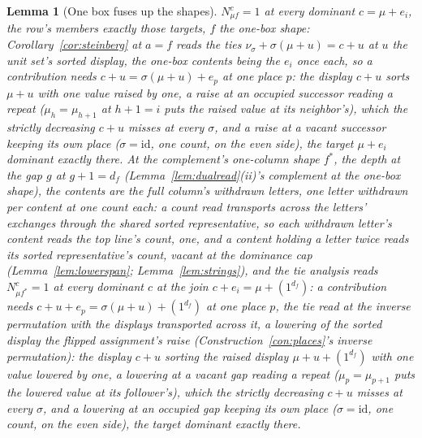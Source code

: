\documentclass[11pt]{article}
\newtheorem{lemma}{Lemma}
\theoremstyle{definition}
\begin{document}
\begin{lemma}[One box fuses up the shapes]\label{lem:pieri}
$N^c_{\mu f}=1$ at every dominant $c=\mu+e_i$, the row's members
exactly those targets, $f$ the
one-box shape: Corollary~\ref{cor:steinberg} at $a=f$ reads the ties
$\nu_\sigma+\sigma(\mu+u)=c+u$ at $u$ the unit set's sorted
display, the one-box
contents being the $e_i$ once each, so a contribution needs
$c+u=\sigma(\mu+u)+e_p$ at one place $p$: the display $c+u$ sorts
$\mu+u$ with one value raised by one, a raise at an occupied
successor reading a repeat ($\mu_h=\mu_{h+1}$ at $h+1=i$ puts the
raised value at its neighbor's), which the strictly decreasing
$c+u$ misses at every $\sigma$, and a raise at a vacant successor
keeping its own place ($\sigma=\mathrm{id}$, one count, on the
even side), the target $\mu+e_i$ dominant exactly there. At the
complement's one-column shape $f^*$, the depth at the gap $g$ at
$g+1=d_f$ (Lemma~\ref{lem:dualread}(ii)'s complement at the
one-box shape), the contents are the full column's withdrawn
letters, one letter withdrawn per content at one count each: a
count read transports across the letters' exchanges through the
shared sorted representative, so each withdrawn letter's content
reads the top line's count, one, and a content holding a letter
twice reads its sorted representative's count, vacant at the
dominance cap (Lemma~\ref{lem:lowerspan};
Lemma~\ref{lem:strings}), and the
tie analysis reads $N^c_{\mu f^*}=1$ at every dominant $c$ at the
join $c+e_i=\mu+(1^{d_f})$: a contribution needs
$c+u+e_p=\sigma(\mu+u)+(1^{d_f})$ at one place $p$, the tie read
at the inverse permutation with the displays transported across
it, a lowering of the sorted display the flipped assignment's
raise (Construction~\ref{con:places}'s inverse permutation): the
display
$c+u$ sorting the raised display $\mu+u+(1^{d_f})$ with one value
lowered by one, a lowering at a vacant gap reading a repeat
($\mu_p=\mu_{p+1}$ puts the lowered value at its follower's),
which the strictly decreasing $c+u$ misses at every $\sigma$, and
a lowering at an occupied gap keeping its own place
($\sigma=\mathrm{id}$, one count, on the even side), the target
dominant exactly there.
\end{lemma}
\end{document}
